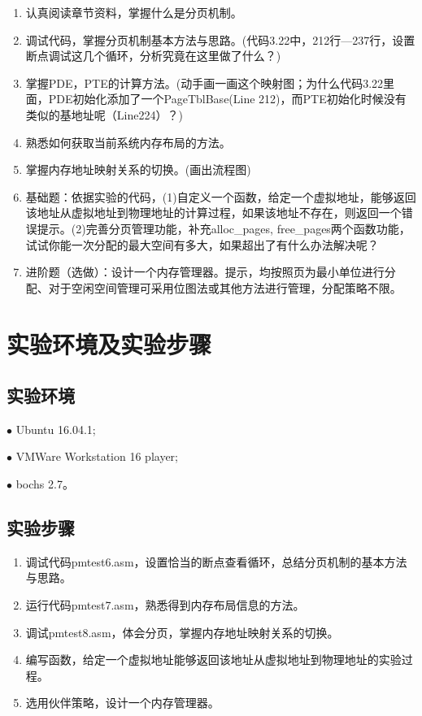 \documentclass[UTF8,12pt]{ctexart}
\begin{document}
    \begin{enumerate}
    \item 认真阅读章节资料，掌握什么是分页机制。
    
    \item 调试代码，掌握分页机制基本方法与思路。(代码3.22中，212行---237行，设置断点调试这几个循环，分析究竟在这里做了什么？)
    
    \item 掌握PDE，PTE的计算方法。(动手画一画这个映射图；为什么代码3.22里面，PDE初始化添加了一个PageTblBase(Line 212)，而PTE初始化时候没有类似的基地址呢（Line224）？)
    
    \item 熟悉如何获取当前系统内存布局的方法。
    
    \item 掌握内存地址映射关系的切换。(画出流程图)
    
    \item 基础题：依据实验的代码，(1)自定义一个函数，给定一个虚拟地址，能够返回该地址从虚拟地址到物理地址的计算过程，如果该地址不存在，则返回一个错误提示。(2)完善分页管理功能，补充alloc\_pages, free\_pages两个函数功能，试试你能一次分配的最大空间有多大，如果超出了有什么办法解决呢？
    
    \item 进阶题（选做）：设计一个内存管理器。提示，均按照页为最小单位进行分配、对于空闲空间管理可采用位图法或其他方法进行管理，分配策略不限。
    \end{enumerate}
    
    \section{实验环境及实验步骤}
    \subsection{实验环境}
    $\bullet$ Ubuntu 16.04.1;
    
    $\bullet$ VMWare Workstation 16 player;
    
    $\bullet$ bochs 2.7。
    
    \subsection{实验步骤}
    \begin{enumerate}
        \item 调试代码pmtest6.asm，设置恰当的断点查看循环，总结分页机制的基本方法与思路。
        \item 运行代码pmtest7.asm，熟悉得到内存布局信息的方法。
        \item 调试pmtest8.asm，体会分页，掌握内存地址映射关系的切换。
        \item 编写函数，给定一个虚拟地址能够返回该地址从虚拟地址到物理地址的实验过程。
        \item 选用伙伴策略，设计一个内存管理器。
    \end{enumerate} 
    
\end{document}
